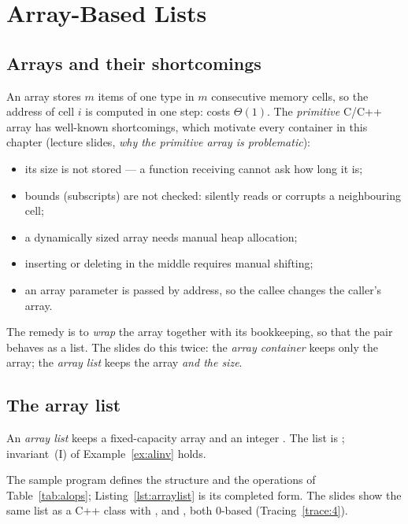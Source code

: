 \chapter{Array-Based Lists}\label{ch:arrays}

\section{Arrays and their shortcomings}

An array stores $m$ items of one type in $m$ consecutive memory cells, so the address of
cell $i$ is computed in one step:  costs $\Theta(1)$. The \emph{primitive}
C/C++ array has well-known shortcomings, which motivate every container in this chapter
(lecture slides, \emph{why the primitive array is problematic}):
\begin{itemize}
\item its size is not stored --- a function receiving  cannot ask how long it is;
\item bounds (subscripts) are not checked:  silently reads or corrupts a
  neighbouring cell;
\item a dynamically sized array needs manual heap allocation;
\item inserting or deleting in the middle requires manual shifting;
\item an array parameter is passed by address, so the callee changes the caller's array.
\end{itemize}
The remedy is to \emph{wrap} the array together with its bookkeeping, so that the pair
behaves as a list. The slides do this twice: the \emph{array container} keeps only the
array; the \emph{array list} keeps the array \emph{and the size}.

\section{The array list}

\begin{definition}
An \emph{array list} keeps a fixed-capacity array  and an integer
. The list is ; invariant~(I) of
Example~\ref{ex:alinv} holds.
\end{definition}

The sample program  defines the structure and the operations of
Table~\ref{tab:alops}; Listing~\ref{lst:arraylist} is its completed form. The slides
show the same list as a C++ class  with , 
and , both 0-based (Tracing~\ref{trace:4}).

